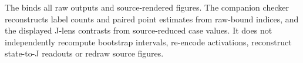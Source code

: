 The 
binds all raw outputs and source-rendered figures. The companion checker
reconstructs label counts and paired point estimates from raw-bound indices,
and the displayed J-lens contrasts from source-reduced case values. It does
not independently recompute bootstrap intervals, re-encode activations,
reconstruct state-to-J readouts or redraw source figures.
